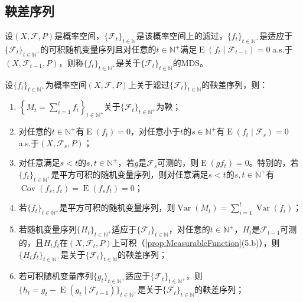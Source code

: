 \subsection{鞅差序列}
\begin{definition}
	设$(X,\mathscr{F},P)$是概率空间，$\{\mathscr{F}_t\}_{t\in\mathbb{N}}$是该概率空间上的滤过，$\{f_t\}_{t\in\mathbb{N}^+}$是适应于$\{\mathscr{F}_t\}_{t\in\mathbb{N}^+}$的可积随机变量序列且对任意的$t\in\mathbb{N}^+$满足$\operatorname{E}(f_t\mid\mathscr{F}_{t-1})=0\;$a.s.于$(X,\mathscr{F}_{t-1},P)$，则称$\{f_t\}_{t\in\mathbb{N}^+}$是关于$\{\mathscr{F}_t\}_{t\in\mathbb{N}}$的\gls{MDS}。
\end{definition}
\begin{property}
	设$\{f_t\}_{t\in\mathbb{N}^+}$为概率空间$(X,\mathscr{F},P)$上关于滤过$\{\mathscr{F}_t\}_{t\in\mathbb{N}}$的鞅差序列，则：
	\begin{enumerate}
		\item $\left\{M_t=\sum\limits_{i=1}^{t}f_i\right\}_{t\in\mathbb{N}^+}$关于$\{\mathscr{F}_t\}_{t\in\mathbb{N}^+}$为鞅；
		\item 对任意的$t\in\mathbb{N}^+$有$\operatorname{E}(f_t)=0$，对任意小于$t$的$s\in\mathbb{N}^+$有$\operatorname{E}(f_t\mid\mathscr{F}_s)=0\;$a.s.于$(X,\mathscr{F}_s,P)$；
		\item 对任意满足$s<t$的$s,t\in\mathbb{N}^+$，若$g$是$\mathscr{F}_s$可测的，则$\operatorname{E}(gf_t)=0$。特别的，若$\{f_t\}_{t\in\mathbb{N}^+}$是平方可积的随机变量序列，则对任意满足$s<t$的$s,t\in\mathbb{N}^+$有$\operatorname{Cov}(f_s,f_t)=\operatorname{E}(f_sf_t)=0$；
		\item 若$\{f_t\}_{t\in\mathbb{N}^+}$是平方可积的随机变量序列，则$\operatorname{Var}(M_t)=\sum\limits_{i=1}^{t}\operatorname{Var}(f_i)$；
		\item 若随机变量序列$\{H_t\}_{t\in\mathbb{N}^+}$适应于$\{\mathscr{F}_t\}_{t\in\mathbb{N}}$，对任意的$t\in\mathbb{N}^+$，$H_t$是$\mathscr{F}_{t-1}$可测的，且$H_tf_t$在$(X,\mathscr{F}_t,P)$上可积（\cref{prop:MeasurableFunction}(5.b)），则$\{H_tf_t\}_{t\in\mathbb{N}^+}$是关于$\{\mathscr{F}_t\}_{t\in\mathbb{N}}$的鞅差序列；
		\item 若可积随机变量序列$\{g_t\}_{t\in\mathbb{N}^+}$适应于$\{\mathscr{F}_t\}_{t\in\mathbb{N}^+}$，则$\{h_t=g_t-\operatorname{E}(g_t\mid\mathscr{F}_{t-1})\}_{t\in\mathbb{N}^+}$是关于$\{\mathscr{F}_t\}_{t\in\mathbb{N}}$的鞅差序列；
	\end{enumerate}
\end{property}
